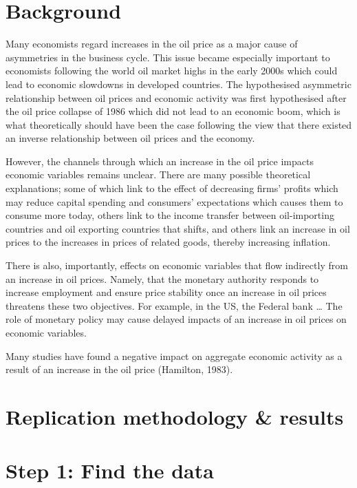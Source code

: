 \documentclass[11pt,preprint, authoryear]{elsarticle}
\numberwithin{equation}{section}
\numberwithin{figure}{section}
\numberwithin{table}{section}
\begin{document}
\hypertarget{background}{%
\section{Background}\label{background}}

Many economists regard increases in the oil price as a major cause of
asymmetries in the business cycle. This issue became especially
important to economists following the world oil market highs in the
early 2000s which could lead to economic slowdowns in developed
countries. The hypothesised asymmetric relationship between oil prices
and economic activity was first hypothesised after the oil price
collapse of 1986 which did not lead to an economic boom, which is what
theoretically should have been the case following the view that there
existed an inverse relationship between oil prices and the economy.

However, the channels through which an increase in the oil price impacts
economic variables remains unclear. There are many possible theoretical
explanations; some of which link to the effect of decreasing firms'
profits which may reduce capital spending and consumers' expectations
which causes them to consume more today, others link to the income
transfer between oil-importing countries and oil exporting countries
that shifts, and others link an increase in oil prices to the increases
in prices of related goods, thereby increasing inflation.

There is also, importantly, effects on economic variables that flow
indirectly from an increase in oil prices. Namely, that the monetary
authority responds to increase employment and ensure price stability
once an increase in oil prices threatens these two objectives. For
example, in the US, the Federal bank \ldots{} The role of monetary
policy may cause delayed impacts of an increase in oil prices on
economic variables.

Many studies have found a negative impact on aggregate economic activity
as a result of an increase in the oil price (Hamilton, 1983).

\hypertarget{replication-methodology-results}{%
\section{Replication methodology \&
results}\label{replication-methodology-results}}

\hypertarget{step-1-find-the-data}{%
\section{Step 1: Find the data}\label{step-1-find-the-data}}
\end{document}
